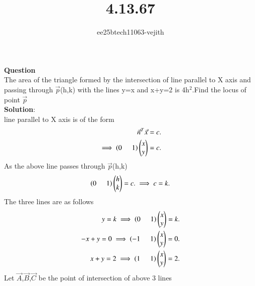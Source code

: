 \documentclass[journal]{IEEEtran}
\begin{document}

\vspace{3cm}

\title{4.13.67}
\author{ee25btech11063-vejith}

\maketitle
{\let\newpage\relax\maketitle}
\renewcommand{\thefigure}{\theenumi}
\renewcommand{\thetable}{\theenumi}
\setlength{\intextsep}{10pt} %
\textbf{Question}\\
The area of the triangle formed by the intersection of line parallel to X axis and passing through $\Vec{p}$(h,k) with the lines y=x and x+y=2 is 4h$^2$.Find the locus of point $\Vec{p}$\\
\textbf{Solution}:\\
line parallel to X axis is of the form 
\begin{align}
    \Vec{n}^T\Vec{x}=c.\\
     \implies \left(0\hspace{0.5cm}1\right)\begin{pmatrix}x\\y\end{pmatrix}=c.
\end{align}
As the above line passes through $\Vec{p}$(h,k)
\begin{align}
     \left(0\hspace{0.5cm}1\right)\begin{pmatrix}h\\k\end{pmatrix}=c.
     \implies c=k.
\end{align}
The three lines are as follows
\begin{align}
    y=k\implies \left(0\hspace{0.5cm}1\right)\begin{pmatrix}x\\y\end{pmatrix}=k.\\
    -x+y=0 \implies \left(-1\hspace{0.5cm}1\right)\begin{pmatrix}x\\y\end{pmatrix}=0.\\
    x+y=2 \implies\left(1\hspace{0.5cm}1\right)\begin{pmatrix}x\\y\end{pmatrix}=2.
\end{align}
Let $\Vec{A}$,$\Vec{B}$,$\Vec{C}$ be the point of intersection of above 3 lines\\
\end{document}
